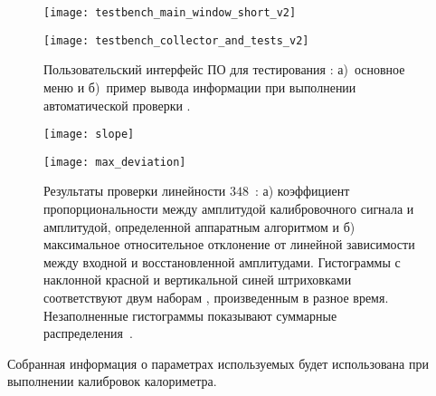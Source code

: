 \begin{figure}[H]
 \centering
 \begin{minipage}[b]{0.49\textwidth}
 \centering
  \texttt{[image: testbench\_main\_window\_short\_v2]}
  \subcaption{}
  \label{fig:testbench-main-menu}
 \end{minipage}
 \begin{minipage}[b]{0.49\textwidth}
 \centering
  \texttt{[image: testbench\_collector\_and\_tests\_v2]}
  \subcaption{}
  \label{fig:testbench-test-info}
 \end{minipage}
  \caption{Пользовательский интерфейс ПО для тестирования \sdsp: а)~основное меню и б)~пример вывода информации при выполнении автоматической проверки \sdsp.}
\label{fig:testbench-interface}
\end{figure}

\begin{figure}[htb]
 \centering
 \begin{minipage}[b]{0.49\textwidth}
 \centering
  \texttt{[image: slope]}
  \subcaption{}
  \label{fig:slope}
 \end{minipage}
 \begin{minipage}[b]{0.49\textwidth}
 \centering
  \texttt{[image: max\_deviation]}
  \subcaption{}
  \label{fig:max_deviation}
 \end{minipage}
  \caption{Результаты проверки линейности $348$~\sdsp: а) коэффициент пропорциональности между амплитудой калибровочного сигнала и амплитудой, определенной аппаратным алгоритмом \sdsp и б) максимальное относительное отклонение от линейной зависимости между входной и восстановленной амплитудами.  Гистограммы с наклонной красной и вертикальной синей штриховками соответствуют двум наборам \sdsp, произведенным в разное время.  Незаполненные гистограммы показывают суммарные распределения~\cite{testbench}.}
\label{fig:testbench-linearity}
\end{figure}

Собранная информация о параметрах используемых \sdsp будет использована при выполнении калибровок калориметра.
